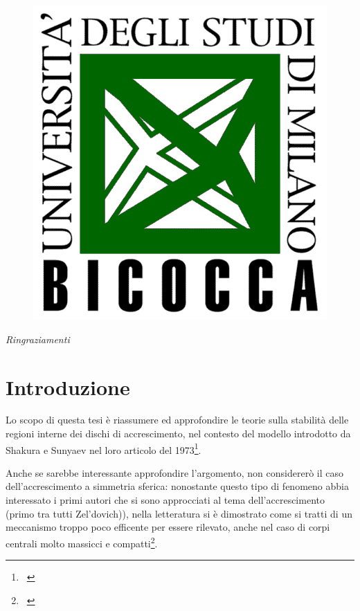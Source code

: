 \documentclass[a4paperbi]{article}
\begin{document}
\begin{titlepage}
	\begin{figure}[H]
		\centering
		\includegraphics[width=0.4\linewidth]{LogoBicocca}
		\label{fig:logobicocca}
	\end{figure} %
\vfill %
\end{titlepage}

\newpage
\clearpage\null

\newpage
\vspace*{\fill}
\textit{Ringraziamenti}\\[2cm]
\vspace*{\fill}

\newpage
\vspace*{\fill}
\tableofcontents
\vspace*{\fill}

\newpage
\section{Introduzione}
	Lo scopo di questa tesi è riassumere ed approfondire le teorie sulla stabilità delle regioni interne dei dischi di accrescimento, nel contesto del modello introdotto da Shakura e Sunyaev nel loro articolo del 1973\footnote{~\cite{ShakuraSunyaev1973}}.

	Anche se sarebbe interessante approfondire l'argomento, non considererò il caso dell'accrescimento a simmetria sferica: nonostante questo tipo di fenomeno abbia interessato i primi autori che si sono approcciati al tema dell'accrescimento (primo tra tutti Zel'dovich)), nella letteratura si è dimostrato come si tratti di un meccanismo troppo poco efficente per essere rilevato, anche nel caso di corpi centrali molto massicci e compatti\footnote{~\cite{PringleReesePacholczyk1973}}.
\end{document}
